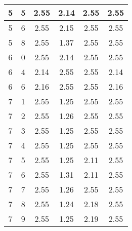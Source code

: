 \begin{longtable}{|c|c||c||c|c||c|}
	5 & 5 & 2.55 & 2.14 & 2.55 & 2.55 \\ \hline
	5 & 6 & 2.55 & 2.15 & 2.55 & 2.55 \\ \hline
	5 & 8 & 2.55 & 1.37 & 2.55 & 2.55 \\ \hline
	6 & 0 & 2.55 & 2.14 & 2.55 & 2.55 \\ \hline
	6 & 4 & 2.14 & 2.55 & 2.55 & 2.14 \\ \hline
	6 & 6 & 2.16 & 2.55 & 2.55 & 2.16 \\ \hline
	7 & 1 & 2.55 & 1.25 & 2.55 & 2.55 \\ \hline
	7 & 2 & 2.55 & 1.26 & 2.55 & 2.55 \\ \hline
	7 & 3 & 2.55 & 1.25 & 2.55 & 2.55 \\ \hline
	7 & 4 & 2.55 & 1.25 & 2.55 & 2.55 \\ \hline
	7 & 5 & 2.55 & 1.25 & 2.11 & 2.55 \\ \hline
	7 & 6 & 2.55 & 1.31 & 2.11 & 2.55 \\ \hline
	7 & 7 & 2.55 & 1.26 & 2.55 & 2.55 \\ \hline
	7 & 8 & 2.55 & 1.24 & 2.18 & 2.55 \\ \hline
	7 & 9 & 2.55 & 1.25 & 2.19 & 2.55 \\ \hline
\end{longtable}
\clearpage{}
